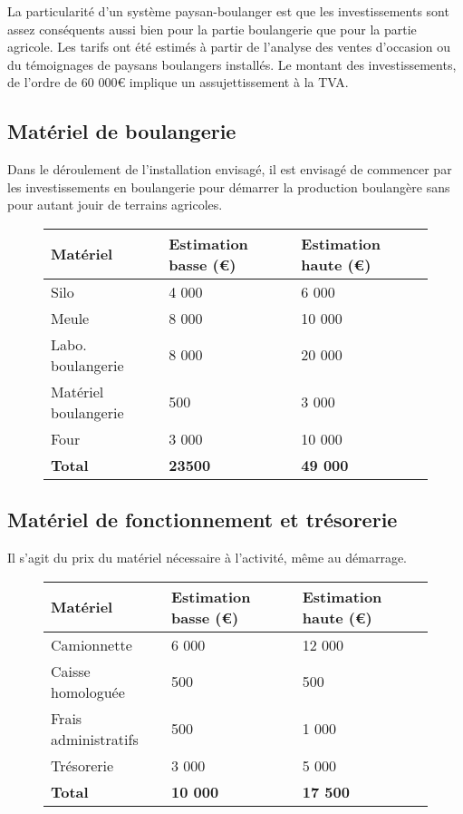 \documentclass{article}
\begin{document}
La particularité d'un système paysan-boulanger est que les investissements sont assez conséquents aussi bien pour la partie boulangerie que pour la partie agricole. Les tarifs ont été estimés à partir de l'analyse des ventes d'occasion ou du témoignages de paysans boulangers installés. Le montant des investissements, de l'ordre de 60 000\euro{} implique un assujettissement à la TVA.

\subsection{Matériel de boulangerie}

Dans le déroulement de l'installation envisagé, il est envisagé de commencer par les investissements en boulangerie pour démarrer la production boulangère sans pour autant jouir de terrains agricoles.

\begin{figure}[h!]
\begin{center}
\begin{tabular}{|p{4cm}|p{3.5cm}|p{3.5cm}|}
\hline
 Matériel & Estimation basse (\euro{}) & Estimation haute (\euro{})\\
\hline
Silo & \hfill 4 000 & \hfill 6 000 \\
Meule & \hfill 8 000 & \hfill 10 000 \\
Labo. boulangerie & \hfill 8 000 & \hfill 20 000 \\ 
Matériel boulangerie & \hfill 500 & \hfill 3 000 \\
Four & \hfill 3 000 & \hfill 10 000 \\
\hline
\textbf{Total} & \hfill \textbf{23500} & \hfill \textbf{49 000}
\\
\hline
\end{tabular}
\end{center}
\label{sejour_semaine}
\end{figure}

\subsection{Matériel de fonctionnement et trésorerie}

Il s'agit du prix du matériel nécessaire à l'activité, même au démarrage. 

\begin{figure}[h!]
\begin{center}
\begin{tabular}{|p{4cm}|p{3.5cm}|p{3.5cm}|}
\hline
 Matériel & Estimation basse (\euro{}) & Estimation haute (\euro{})\\
\hline
Camionnette & \hfill 6 000 & \hfill 12 000 \\
Caisse homologuée & \hfill 500 & \hfill 500 \\
Frais administratifs & \hfill 500 & \hfill 1 000 \\
Trésorerie & \hfill 3 000 & \hfill 5 000 \\
\hline
\textbf{Total} & \hfill \textbf{10 000} & \hfill \textbf{17 500}
\\
\hline
\end{tabular}
\end{center}
\label{sejour_semaine}
\end{figure}
\end{document}
